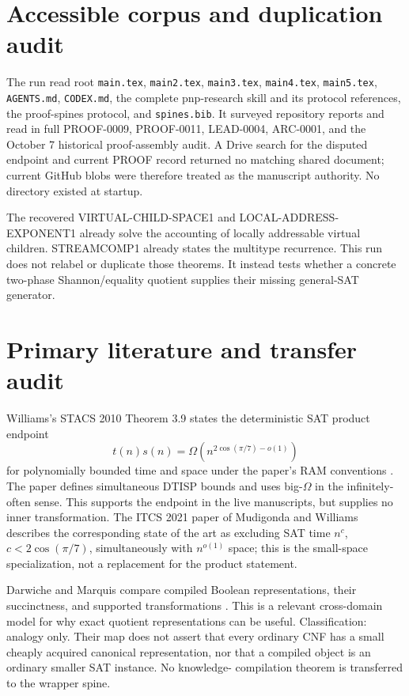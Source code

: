 \documentclass[11pt]{article}
\begin{document}
\section{Accessible corpus and duplication audit}
The run read root \texttt{main.tex}, \texttt{main2.tex},
\texttt{main3.tex}, \texttt{main4.tex}, \texttt{main5.tex},
\texttt{AGENTS.md}, \texttt{CODEX.md}, the complete pnp-research skill and
its protocol references, the proof-spines protocol, and
\texttt{spines.bib}.  It surveyed repository reports and read in full
PROOF-0009, PROOF-0011, LEAD-0004, ARC-0001, and the October 7 historical
proof-assembly audit.  A Drive search for the disputed endpoint and current
PROOF record returned no matching shared document; current GitHub blobs were
therefore treated as the manuscript authority.  No
 directory existed at startup.

The recovered VIRTUAL-CHILD-SPACE1 and LOCAL-ADDRESS-EXPONENT1 already solve
the accounting of locally addressable virtual children.  STREAMCOMP1 already
states the multitype recurrence.  This run does not relabel or duplicate
those theorems.  It instead tests whether a concrete two-phase
Shannon/equality quotient supplies their missing general-SAT generator.

\section{Primary literature and transfer audit}
Williams's STACS 2010 Theorem 3.9 states the deterministic SAT product
endpoint
\[
 t(n)s(n)=\Omega(n^{2\cos(\pi/7)-o(1)})
\]
for polynomially bounded time and space under the paper's RAM conventions
\cite{williams2010}.  The paper defines simultaneous DTISP bounds and uses
big-$\Omega$ in the infinitely-often sense.  This supports the endpoint in
the live manuscripts, but supplies no inner transformation.  The ITCS 2021
paper of Mudigonda and Williams describes the corresponding state of the art
as excluding SAT time $n^c$, $c<2\cos(\pi/7)$, simultaneously with
$n^{o(1)}$ space; this is the small-space specialization, not a replacement
for the product statement.

Darwiche and Marquis compare compiled Boolean representations, their
succinctness, and supported transformations \cite{darwiche2002}.  This is a
relevant cross-domain model for why exact quotient representations can be
useful.  Classification: analogy only.  Their map does not assert that every
ordinary CNF has a small cheaply acquired canonical representation, nor that
a compiled object is an ordinary smaller SAT instance.  No knowledge-
compilation theorem is transferred to the wrapper spine.
\end{document}
